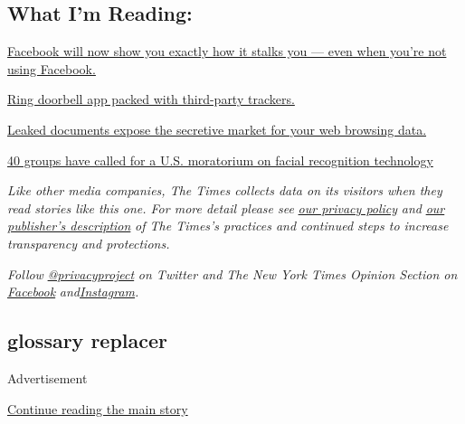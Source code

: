 \hypertarget{what-im-reading}{%
\subsection{What I'm Reading:}\label{what-im-reading}}

\href{https://www.washingtonpost.com/technology/2020/01/28/off-facebook-activity-page/}{Facebook
will now show you exactly how it stalks you --- even when you're not
using Facebook.}

\href{https://www.eff.org/deeplinks/2020/01/ring-doorbell-app-packed-third-party-trackers}{Ring
doorbell app packed with third-party trackers.}

\href{https://t.co/kXGegjaSPp?amp=1}{Leaked documents expose the
secretive market for your web browsing data.}

\href{https://www.technologyreview.com/f/615098/facial-recognition-clearview-ai-epic-privacy-moratorium-surveillance/}{40
groups have called for a U.S. moratorium on facial recognition
technology}

\emph{Like other media companies, The Times collects data on its
visitors when they read stories like this one. For more detail please
see}
\href{https://help.nytimes.com/hc/en-us/articles/115014892108-Privacy-policy?module=inline}{\emph{our
privacy policy}} \emph{and}
\href{https://www.nytimes.com/2019/04/10/opinion/sulzberger-new-york-times-privacy.html?rref=collection\%2Fspotlightcollection\%2Fprivacy-project-does-privacy-matter\&action=click\&contentCollection=opinion\&region=stream\&module=stream_unit\&version=latest\&contentPlacement=8\&pgtype=collection}{\emph{our
publisher's description}} \emph{of The Times's practices and continued
steps to increase transparency and protections.}

\emph{Follow}
\href{https://twitter.com/privacyproject}{\emph{@privacyproject}}
\emph{on Twitter and The New York Times Opinion Section on}
\href{https://www.facebook.com/nytopinion}{\emph{Facebook}}
\emph{and}\href{https://www.instagram.com/nytopinion/}{\emph{Instagram}}\emph{.}

\hypertarget{glossary-replacer}{%
\subsection{glossary replacer}\label{glossary-replacer}}

Advertisement

\protect\hyperlink{after-bottom}{Continue reading the main story}

